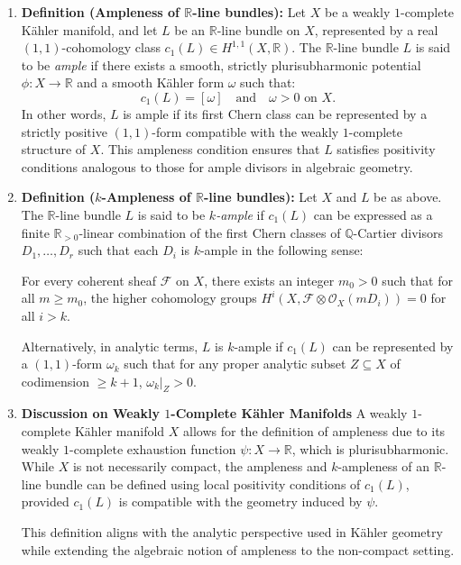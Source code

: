 \documentclass[lang=cn,zihao=-4,a4paper,fontset=none]{beautybook}
\begin{document}
\begin{enumerate}
    \item \textbf{Definition (Ampleness of $\mathbb{R}$-line bundles):}  
    Let $X$ be a weakly $1$-complete Kähler manifold, and let $L$ be an $\mathbb{R}$-line bundle on $X$, represented by a real $(1,1)$-cohomology class $c_1(L) \in H^{1,1}(X, \mathbb{R})$. The $\mathbb{R}$-line bundle $L$ is said to be \emph{ample} if there exists a smooth, strictly plurisubharmonic potential $\phi: X \to \mathbb{R}$ and a smooth Kähler form $\omega$ such that:
    \[
    c_1(L) = [\omega] \quad \text{and} \quad \omega > 0 \text{ on } X.
    \]
    In other words, $L$ is ample if its first Chern class can be represented by a strictly positive $(1,1)$-form compatible with the weakly $1$-complete structure of $X$. This ampleness condition ensures that $L$ satisfies positivity conditions analogous to those for ample divisors in algebraic geometry.

    \item \textbf{Definition ($k$-Ampleness of $\mathbb{R}$-line bundles):}  
    Let $X$ and $L$ be as above. The $\mathbb{R}$-line bundle $L$ is said to be \emph{$k$-ample} if $c_1(L)$ can be expressed as a finite $\mathbb{R}_{>0}$-linear combination of the first Chern classes of $\mathbb{Q}$-Cartier divisors $D_1, \dots, D_r$ such that each $D_i$ is $k$-ample in the following sense:

    For every coherent sheaf $\mathcal{F}$ on $X$, there exists an integer $m_0 > 0$ such that for all $m \geq m_0$, the higher cohomology groups $H^i(X, \mathcal{F} \otimes \mathcal{O}_X(mD_i)) = 0$ for all $i > k$.

    Alternatively, in analytic terms, $L$ is $k$-ample if $c_1(L)$ can be represented by a $(1,1)$-form $\omega_k$ such that for any proper analytic subset $Z \subseteq X$ of codimension $\geq k+1$, $\omega_k|_Z > 0$.

    \item \textbf{Discussion on Weakly $1$-Complete Kähler Manifolds}  
    A weakly $1$-complete Kähler manifold $X$ allows for the definition of ampleness due to its weakly $1$-complete exhaustion function $\psi: X \to \mathbb{R}$, which is plurisubharmonic. While $X$ is not necessarily compact, the ampleness and $k$-ampleness of an $\mathbb{R}$-line bundle can be defined using local positivity conditions of $c_1(L)$, provided $c_1(L)$ is compatible with the geometry induced by $\psi$.

    This definition aligns with the analytic perspective used in Kähler geometry while extending the algebraic notion of ampleness to the non-compact setting.

\end{enumerate}
\end{document}
